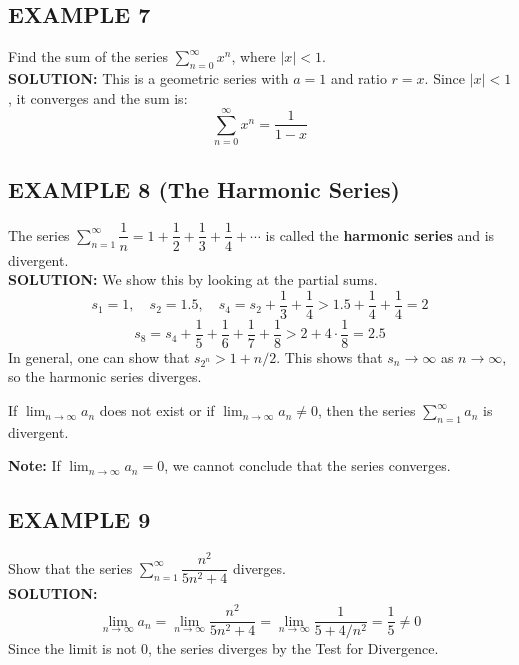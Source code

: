 \documentclass{article}
\begin{document}
\subsection*{EXAMPLE 7}
Find the sum of the series \( \sum_{n=0}^{\infty} x^n \), where \(|x|<1\).\\
\textbf{SOLUTION:}
This is a geometric series with \(a=1\) and ratio \(r=x\). Since \(|x|<1\), it converges and the sum is:
\[ \sum_{n=0}^{\infty} x^n = \dfrac{1}{1-x} \]


\subsection*{EXAMPLE 8 (The Harmonic Series)}
The series \( \sum_{n=1}^{\infty} \dfrac{1}{n} = 1 + \dfrac{1}{2} + \dfrac{1}{3} + \dfrac{1}{4} + \cdots \) is called the \textbf{harmonic series} and is divergent.\\
\textbf{SOLUTION:}
We show this by looking at the partial sums.
\[ s_1 = 1, \quad s_2 = 1.5, \quad s_4 = s_2 + \dfrac{1}{3} + \dfrac{1}{4} > 1.5 + \dfrac{1}{4} + \dfrac{1}{4} = 2 \]
\[ s_8 = s_4 + \dfrac{1}{5} + \dfrac{1}{6} + \dfrac{1}{7} + \dfrac{1}{8} > 2 + 4 \cdot \dfrac{1}{8} = 2.5 \]
In general, one can show that \(s_{2^n} > 1 + n/2\). This shows that \(s_n \to \infty\) as \(n \to \infty\), so the harmonic series diverges.

\begin{tcolorbox}[
    colback=white,
    colframe=orange!80!white,
    title=Theorem: Test for Divergence,
    boxrule=0.5mm,
    arc=3mm
    ]
    If \( \lim_{n\to\infty} a_n \) does not exist or if \( \lim_{n\to\infty} a_n \neq 0 \), then the series \( \sum_{n=1}^{\infty} a_n \) is divergent.
\end{tcolorbox}
\textbf{Note:} If \( \lim_{n\to\infty} a_n = 0 \), we cannot conclude that the series converges.

\subsection*{EXAMPLE 9}
Show that the series \( \sum_{n=1}^{\infty} \dfrac{n^2}{5n^2+4} \) diverges.\\
\textbf{SOLUTION:}
\[ \lim_{n\to\infty} a_n = \lim_{n\to\infty} \dfrac{n^2}{5n^2+4} = \lim_{n\to\infty} \dfrac{1}{5+4/n^2} = \dfrac{1}{5} \neq 0 \]
Since the limit is not 0, the series diverges by the Test for Divergence.
\end{document}
